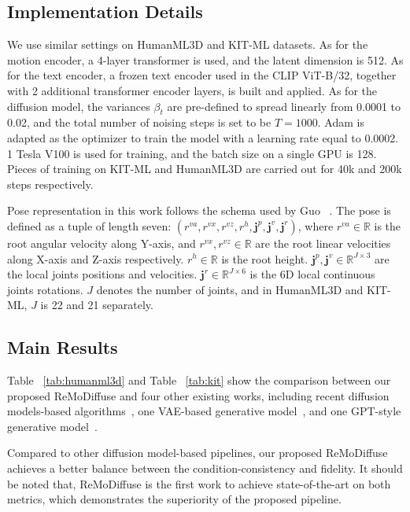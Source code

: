 \documentclass[10pt,twocolumn,letterpaper]{article}
\newcommand{\name}{ReMoDiffuse\xspace}
\begin{document}
\subsection{Implementation Details}

We use similar settings on HumanML3D and KIT-ML datasets. As for the motion encoder, a 4-layer transformer is used, and the latent dimension is 512. As for the text encoder, a frozen text encoder used in the CLIP ViT-B/32, together with 2 additional transformer encoder layers, is built and applied. As for the diffusion model, the variances $\beta_t$ are pre-defined to spread linearly from 0.0001 to 0.02, and the total number of noising steps is set to be $T = 1000$. Adam is adapted as the optimizer to train the model with a learning rate equal to 0.0002. 1 Tesla V100 is used for training, and the batch size on a single GPU is 128. Pieces of training on KIT-ML and HumanML3D are carried out for 40k and 200k steps respectively. \par
Pose representation in this work follows the schema used by Guo \etal~\cite{guo2022generating}. The pose is defined as a tuple of length seven: $(r^{va},r^{vx}, r^{vz},r^h, \mathbf{j}^p, \mathbf{j}^v, \mathbf{j}^r)$, where $r^{va}\in \mathbb{R}$ is the root angular velocity along Y-axis, and $r^{vx}, r^{vz}\in \mathbb{R}$ are the root linear velocities along X-axis and Z-axis respectively. $r^h \in \mathbb{R}$ is the root height. $\mathbf{j}^p, \mathbf{j}^v \in \mathbb{R}^{J \times 3}$ are the local joints positions and velocities. $\mathbf{j}^r \in \mathbb{R}^{J \times 6}$ is the 6D local continuous joints rotations. $J$ denotes the number of joints, and in HumanML3D and KIT-ML, $J$ is 22 and 21 separately.


\subsection{Main Results}




Table ~\ref{tab:humanml3d} and Table ~\ref{tab:kit} show the comparison between our proposed \name and four other existing works, including recent diffusion models-based algorithms~\cite{tevet2022human, zhang2022motiondiffuse}, one VAE-based generative model~\cite{guo2022generating}, and one GPT-style generative model~\cite{zhang2023generating}.


Compared to other diffusion model-based pipelines, our proposed \name achieves a better balance between the condition-consistency and fidelity. It should be noted that, \name is the first work to achieve state-of-the-art on both metrics, which demonstrates the superiority of the proposed pipeline. 
\end{document}
